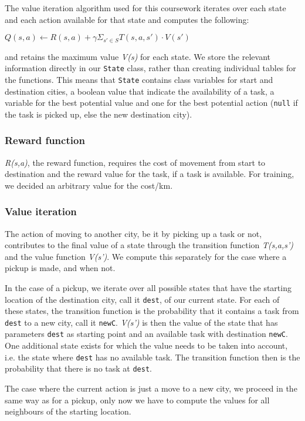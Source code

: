 \documentclass[12pt,a4paper]{article}
\begin{document}
The value iteration algorithm used for this coursework iterates over each state and each action available for that state and computes the following:
\begin{center}
$Q(s,a) \longleftarrow R(s,a) + \gamma \Sigma_{s' \in S} T(s,a,s')\cdot V(s')$ 
\end{center}
and retains the maximum value \textit{V(s)} for each state. We store the relevant information directly in our \texttt{State} class, rather than creating individual tables for the functions. This means that \texttt{State} contains class variables for start and destination cities, a boolean value that indicate the availability of a task, a variable for the best potential value and one for the best potential action (\texttt{null} if the task is picked up, else the new destination city).

\subsubsection*{Reward function}
\textit{R(s,a)}, the reward function, requires the cost of movement from start to destination and the reward value for the task, if a task is available. For training, we decided an arbitrary value for the cost/km.

\subsubsection*{Value iteration}
The action of moving to another city, be it by picking up a task or not, contributes to the final value of a state through the transition function \textit{T(s,a,s')} and the value function \textit{V(s')}. We compute this separately for the case where a pickup is made, and when not. 

In the case of a pickup, we iterate over all possible states that have the starting location of the destination city, call it \texttt{dest}, of our current state. For each of these states, the transition function is the probability that it contains a task from \texttt{dest} to a new city, call it \texttt{newC}. \textit{V(s')} is then the value of the state that has parameters \texttt{dest} as starting point and an available task with destination \texttt{newC}. One additional state exists for which the value needs to be taken into account, i.e. the state where \texttt{dest} has no available task. The transition function then is the probability that there is no task at \texttt{dest}.

The case where the current action is just a move to a new city, we proceed in the same way as for a pickup, only now we have to compute the values for all neighbours of the starting location.
\end{document}
